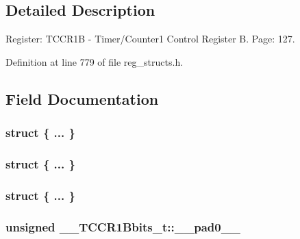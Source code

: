 \subsection{Detailed Description}
Register\+: T\+C\+C\+R1\+B -\/ Timer/\+Counter1 Control Register B. Page\+: 127. 

Definition at line 779 of file reg\+\_\+structs.\+h.



\subsection{Field Documentation}
\hypertarget{union_____t_c_c_r1_bbits__t_aa2b25d01c73a1673eee6ca9ea52f132b}{\subsubsection[{"@189}]{\setlength{\rightskip}{0pt plus 5cm}struct \{ ... \} }}\label{union_____t_c_c_r1_bbits__t_aa2b25d01c73a1673eee6ca9ea52f132b}
\hypertarget{union_____t_c_c_r1_bbits__t_a076582d8a198930fd413ae208ccf8948}{\subsubsection[{"@191}]{\setlength{\rightskip}{0pt plus 5cm}struct \{ ... \} }}\label{union_____t_c_c_r1_bbits__t_a076582d8a198930fd413ae208ccf8948}
\hypertarget{union_____t_c_c_r1_bbits__t_a41842906e51cbfae1de2cd7a7fd59485}{\subsubsection[{"@193}]{\setlength{\rightskip}{0pt plus 5cm}struct \{ ... \} }}\label{union_____t_c_c_r1_bbits__t_a41842906e51cbfae1de2cd7a7fd59485}
\hypertarget{union_____t_c_c_r1_bbits__t_ae9dd1e2ec844830422bd585483f7d422}{
\subsubsection[{\+\_\+\+\_\+pad0\+\_\+\+\_\+}]{\setlength{\rightskip}{0pt plus 5cm}unsigned \+\_\+\+\_\+\+T\+C\+C\+R1\+Bbits\+\_\+t\+::\+\_\+\+\_\+pad0\+\_\+\+\_\+}}\label{union_____t_c_c_r1_bbits__t_ae9dd1e2ec844830422bd585483f7d422}


